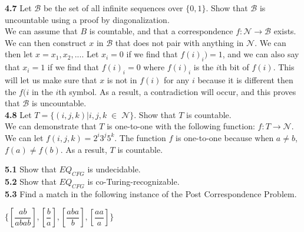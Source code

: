 \documentclass[12pt]{article}
\begin{document}
\pagebreak
\textbf{4.7} Let $\mathcal{B}$ be the set of all infinite sequences over $\{0, 1\}$. 
Show that $\mathcal{B}$ is uncountable using a proof by diagonalization. \\

We can assume that $B$ is countable, and that a correspondence $f:\mathcal{N} \rightarrow \mathcal{B}$
exists. We can then construct $x$ in $\mathcal{B}$ that does not pair with anything in $\mathcal{N}$.
We can then let $x = x_1, x_2, ...$. Let $x_i = 0$ if we find that $f(i)_i) = 1$, and we can also say that
$x_i = 1$ if we find that $f(i)_i = 0$ where $f(i)_i$ is the $i$th bit of $f(i)$. This will let us make
sure that $x$ is not in $f(i)$ for any $i$ because it is different then the $f(i$ in the $i$th symbol.
As a result, a contradiction will occur, and this proves that $\mathcal{B}$ is uncountable. \\

\textbf{4.8} Let $T = \{(i, j, k)| i, j, k \; \in \; \mathcal{N}\}$. Show that $T$ is countable. \\

We can demonstrate that $T$ is one-to-one with the following function:
$f: T \rightarrow \mathcal{N}$. We can let $f(i, j, k) = 2^i 3^j 5^k$. The function
$f$ is one-to-one because when $a \ne b$, $f(a) \ne f(b)$. As a result, $T$ is countable.


\pagebreak
\textbf{5.1} Show that $EQ_{CFG}$ is undecidable. \\



\textbf{5.2} Show that $EQ_{CFG}$ is co-Turing-recognizable. \\



\textbf{5.3} Find a match in the following instance of the Post Correspondence Problem.

\begin{center}
	$\{ [ \dfrac{ab}{abab} ], [ \dfrac{b}{a} ], [ \dfrac{aba}{b} ], [ \dfrac{aa}{a} ] \}$ \\
\end{center}
\end{document}
